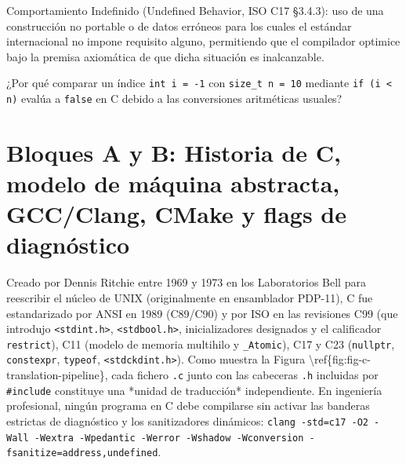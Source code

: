 \documentclass{book}
\begin{document}
\begin{tcolorbox}[title={Definición}, studiumdef, breakable]

Comportamiento Indefinido (Undefined Behavior, ISO C17 §3.4.3): uso de una construcción no portable o de datos erróneos para los cuales el estándar internacional no impone requisito alguno, permitiendo que el compilador optimice bajo la premisa axiomática de que dicha situación es inalcanzable.
\end{tcolorbox}

\begin{tcolorbox}[title={Autoficha}, studiumcheck, breakable]

¿Por qué comparar un índice \texttt{int i = -1} con \texttt{size\_t n = 10} mediante \texttt{if (i < n)} evalúa a \texttt{false} en C debido a las conversiones aritméticas usuales?
\end{tcolorbox}

\section{Bloques A y B: Historia de C, modelo de máquina abstracta, GCC/Clang, CMake y flags de diagnóstico}

Creado por Dennis Ritchie entre 1969 y 1973 en los Laboratorios Bell para reescribir el núcleo de UNIX (originalmente en ensamblador PDP-11), C fue estandarizado por ANSI en 1989 (C89/C90) y por ISO en las revisiones C99 (que introdujo \texttt{<stdint.h>}, \texttt{<stdbool.h>}, inicializadores designados y el calificador \texttt{restrict}), C11 (modelo de memoria multihilo y \texttt{\_Atomic}), C17 y C23 (\texttt{nullptr}, \texttt{constexpr}, \texttt{typeof}, \texttt{<stdckdint.h>}). Como muestra la Figura \textbackslash{}ref\{fig:fig-c-translation-pipeline\}, cada fichero \texttt{.c} junto con las cabeceras \texttt{.h} incluidas por \texttt{\#include} constituye una *unidad de traducción* independiente. En ingeniería profesional, ningún programa en C debe compilarse sin activar las banderas estrictas de diagnóstico y los sanitizadores dinámicos: \texttt{clang -std=c17 -O2 -Wall -Wextra -Wpedantic -Werror -Wshadow -Wconversion -fsanitize=address,undefined}.
\end{document}
